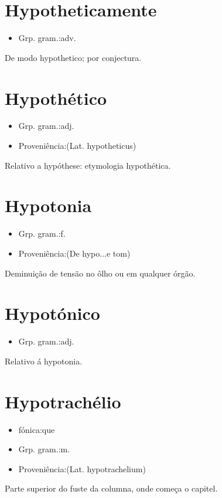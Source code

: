 \documentclass{article}
\begin{document}
\section{Hypotheticamente}
\begin{itemize}
\item {Grp. gram.:adv.}
\end{itemize}
De modo hypothetico; por conjectura.
\section{Hypothético}
\begin{itemize}
\item {Grp. gram.:adj.}
\end{itemize}
\begin{itemize}
\item {Proveniência:(Lat. \textunderscore hypotheticus\textunderscore )}
\end{itemize}
Relativo a hypóthese: \textunderscore etymologia hypothética\textunderscore .
\section{Hypotonia}
\begin{itemize}
\item {Grp. gram.:f.}
\end{itemize}
\begin{itemize}
\item {Proveniência:(De \textunderscore hypo...\textunderscore  e \textunderscore tom\textunderscore )}
\end{itemize}
Deminuição de tensão no ôlho ou em qualquer órgão.
\section{Hypotónico}
\begin{itemize}
\item {Grp. gram.:adj.}
\end{itemize}
Relativo á hypotonia.
\section{Hypotrachélio}
\begin{itemize}
\item {fónica:que}
\end{itemize}
\begin{itemize}
\item {Grp. gram.:m.}
\end{itemize}
\begin{itemize}
\item {Proveniência:(Lat. \textunderscore hypotrachelium\textunderscore )}
\end{itemize}
Parte superior do fuste da columna, onde começa o capitel.
\end{document}

